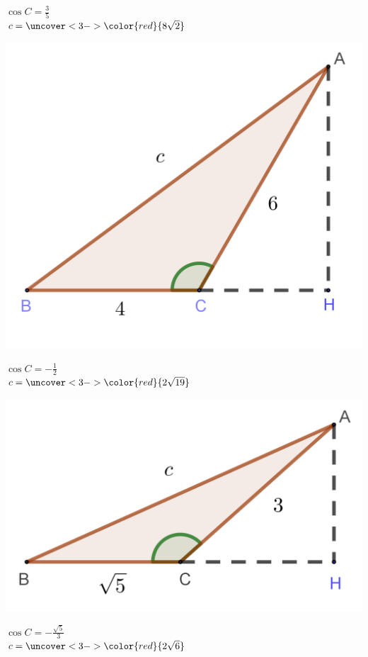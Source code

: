 \documentclass[t,8pt]{beamer}
\newcommand{\red}[1]{\color{red}{#1}}
\begin{document}
\begin{frame}{\subsecname}
\begin{minipage}{.26\textwidth}
\end{minipage}
\begin{minipage}{.15\textwidth}\centering
\(\cos C=\frac35\)\\[20pt]
\(c=\uncover<3->{\red{8\sqrt2}}\)
\end{minipage}

\begin{minipage}{.26\textwidth}\centering
\includegraphics[width=\textwidth]{img/3-3_coslaw_2-3}
\end{minipage}
\begin{minipage}{.15\textwidth}\centering
\(\cos C=-\frac12\)\\[20pt]
\(c=\uncover<3->{\red{2\sqrt{19}}}\)
\end{minipage}
\qquad\qquad\quad
\begin{minipage}{.26\textwidth}\centering
\includegraphics[width=\textwidth]{img/3-3_coslaw_2-4}
\end{minipage}
\begin{minipage}{.15\textwidth}\centering
\(\cos C=-\frac{\sqrt5}3\)\\[20pt]
\(c=\uncover<3->{\red{2\sqrt6}}\)
\end{minipage}
\end{frame}
\end{document}
